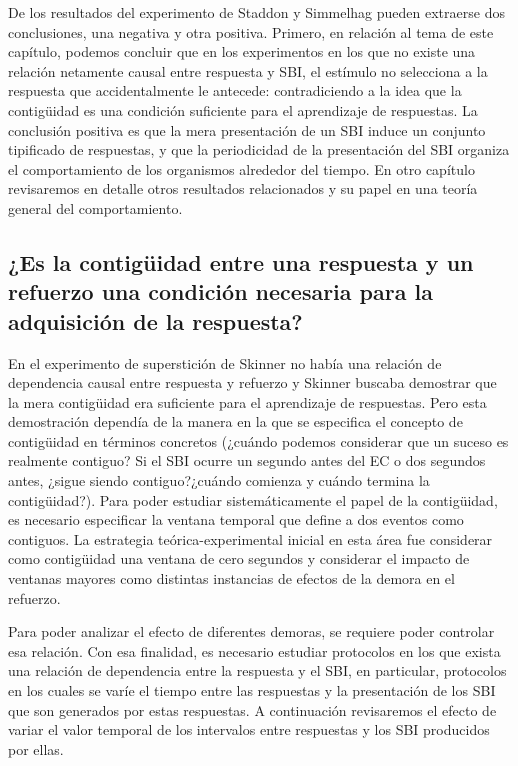 \documentclass[
  letterpaper,
]{book}
\begin{document}
De los resultados del experimento de Staddon y Simmelhag pueden
extraerse dos conclusiones, una negativa y otra positiva. Primero, en
relación al tema de este capítulo, podemos concluir que en los
experimentos en los que no existe una relación netamente causal entre
respuesta y SBI, el estímulo no selecciona a la respuesta que
accidentalmente le antecede: contradiciendo a la idea que la contigüidad
es una condición suficiente para el aprendizaje de respuestas. La
conclusión positiva es que la mera presentación de un SBI induce un
conjunto tipificado de respuestas, y que la periodicidad de la
presentación del SBI organiza el comportamiento de los organismos
alrededor del tiempo. En otro capítulo revisaremos en detalle otros
resultados relacionados y su papel en una teoría general del
comportamiento.

\subsection{¿Es la contigüidad entre una respuesta y un refuerzo una
condición necesaria para la adquisición de la
respuesta?}\label{es-la-contiguxfcidad-entre-una-respuesta-y-un-refuerzo-una-condiciuxf3n-necesaria-para-la-adquisiciuxf3n-de-la-respuesta}

En el experimento de superstición de Skinner no había una relación de
dependencia causal entre respuesta y refuerzo y Skinner buscaba
demostrar que la mera contigüidad era suficiente para el aprendizaje de
respuestas. Pero esta demostración dependía de la manera en la que se
especifica el concepto de contigüidad en términos concretos (¿cuándo
podemos considerar que un suceso es realmente contiguo? Si el SBI ocurre
un segundo antes del EC o dos segundos antes, ¿sigue siendo
contiguo?¿cuándo comienza y cuándo termina la contigüidad?). Para poder
estudiar sistemáticamente el papel de la contigüidad, es necesario
especificar la ventana temporal que define a dos eventos como contiguos.
La estrategia teórica-experimental inicial en esta área fue considerar
como contigüidad una ventana de cero segundos y considerar el impacto de
ventanas mayores como distintas instancias de efectos de la demora en el
refuerzo.

Para poder analizar el efecto de diferentes demoras, se requiere poder
controlar esa relación. Con esa finalidad, es necesario estudiar
protocolos en los que exista una relación de dependencia entre la
respuesta y el SBI, en particular, protocolos en los cuales se varíe el
tiempo entre las respuestas y la presentación de los SBI que son
generados por estas respuestas. A continuación revisaremos el efecto de
variar el valor temporal de los intervalos entre respuestas y los SBI
producidos por ellas.
\end{document}

